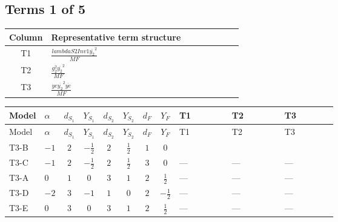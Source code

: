 \documentclass[8pt]{article}
\begin{document}
\begin{landscape}
\subsection*{Terms 1 of 5}
\begin{center}
\begin{tabular}{@{}c >{\raggedright\arraybackslash}p{0.82\linewidth}@{}}
\toprule
Column & Representative term structure \\
\midrule
T1 & \(\displaystyle \frac{lambdaS2Inv1 \overline{y_{2}}^{2}}{MF}\) \\
\midrule
T2 & \(\displaystyle \frac{g_{2}^{2} \overline{y_{2}}^{2}}{MF}\) \\
\midrule
T3 & \(\displaystyle \frac{ye \overline{y_{2}}^{2} \overline{ye}}{MF}\) \\
\midrule
\bottomrule
\end{tabular}
\end{center}
\smallskip
\tiny
\begin{longtable}{@{}llcccccc >{\raggedright\arraybackslash}p{0.21\linewidth} >{\raggedright\arraybackslash}p{0.21\linewidth} >{\raggedright\arraybackslash}p{0.21\linewidth}@{}}
\toprule
Model & $\alpha$ & $d_{S_1}$ & $Y_{S_1}$ & $d_{S_2}$ & $Y_{S_2}$ & $d_F$ & $Y_F$ & T1 & T2 & T3 \\
\midrule
\endfirsthead
\toprule
Model & $\alpha$ & $d_{S_1}$ & $Y_{S_1}$ & $d_{S_2}$ & $Y_{S_2}$ & $d_F$ & $Y_F$ & T1 & T2 & T3 \\
\midrule
\endhead
T3-B & $-1$ & $2$ & $-\frac{1}{2}$ & $2$ & $\frac{1}{2}$ & $1$ & $0$ & \scriptsize\adjustbox{max width=\linewidth}{$\begin{gathered} \frac{lambdaS2Inv1 \overline{y_{2}}^{2}}{4 MF}\end{gathered}$} & \scriptsize\adjustbox{max width=\linewidth}{$\begin{gathered} \frac{3 g_{2}^{2} \overline{y_{2}}^{2}}{8 MF}\end{gathered}$} & \scriptsize\adjustbox{max width=\linewidth}{$\begin{gathered} - \frac{ye \overline{y_{2}}^{2} \overline{ye}}{8 MF}\end{gathered}$} \\
\midrule
T3-C & $-1$ & $2$ & $-\frac{1}{2}$ & $2$ & $\frac{1}{2}$ & $3$ & $0$ & --- & --- & --- \\
\midrule
T3-A & $0$ & $1$ & $0$ & $3$ & $1$ & $2$ & $\frac{1}{2}$ & --- & --- & --- \\
\midrule
T3-D & $-2$ & $3$ & $-1$ & $1$ & $0$ & $2$ & $-\frac{1}{2}$ & --- & --- & --- \\
\midrule
T3-E & $0$ & $3$ & $0$ & $3$ & $1$ & $2$ & $\frac{1}{2}$ & --- & --- & --- \\
\midrule
\bottomrule
\end{longtable}
\clearpage

\end{landscape}
\end{document}
